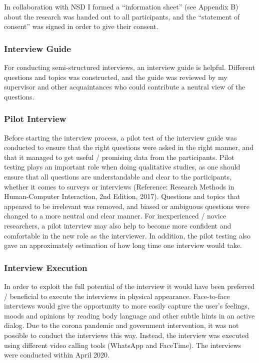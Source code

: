         In collaboration with NSD I formed a “information sheet” (see Appendix B) about the research was handed out to all participants, and the “statement of consent” was signed in order to give their consent. 
        
        
        
        \subsubsection{Interview Guide}
        For conducting semi-structured interviews, an interview guide is helpful. Different questions and topics was constructed, and the guide was reviewed by my supervisor and other acquaintances who could contribute a neutral view of the questions. 
        
        \subsubsection{Pilot Interview}
        Before starting the interview process, a pilot test of the interview guide was conducted to ensure that the right questions were asked in the right manner, and that  it managed to get useful / promising data from the participants. Pilot testing plays an important role when doing qualitative studies, as one should ensure that all questions are understandable and clear to the participants, whether it comes to surveys or interviews (Reference: Research Methods in Human-Computer Interaction, 2nd Edition, 2017). Questions and topics that appeared to be irrelevant was removed, and biased or ambiguous questions were changed to a more neutral and clear manner. For inexperienced / novice researchers, a pilot interview may also help to become more confident and comfortable in the new role as the interviewer. In addition, the pilot testing also gave an approximately estimation of how long time one interview would take. 
        
        \subsubsection{Interview Execution}
        In order to exploit the full potential of the interview it would have been preferred / beneficial to execute the interviews in physical appearance. Face-to-face interviews would give the opportunity to more easily capture the user's feelings, moods and opinions by reading body language and other subtle hints in an active dialog. Due to the corona pandemic and government intervention, it was not possible to conduct the interviews this way.  Instead, the interview was executed using different video calling tools (WhatsApp and FaceTime). The interviews were conducted within April 2020. 
        
